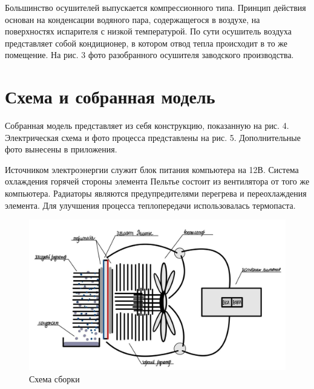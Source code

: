 \documentclass[a4paper,12pt]{article} %
\begin{document}
Большинство осушителей выпускается компрессионного типа. Принцип действия основан на конденсации водяного пара, содержащегося в воздухе, на поверхностях испарителя с низкой температурой. По сути осушитель воздуха представляет собой кондиционер, в котором отвод тепла происходит в то же помещение. На рис. 3 фото разобранного осушителя заводского производства.


\newpage


\section{Схема и собранная модель}

Собранная модель представляет из себя конструкцию, показанную на рис. 4. Электрическая схема и фото процесса представлены на рис. 5. Дополнительные фото вынесены в приложения.

Источником электроэнергии служит блок питания компьютера на 12В. Система охлаждения горячей стороны элемента Пельтье состоит из вентилятора от того же компьютера. Радиаторы являются предупредителями перегрева и переохлаждения элемента. Для улучшения процесса теплопередачи использовалась термопаста.

\begin{figure}[h!]
	\centering
	\includegraphics[scale=0.4]{pic.jpg}
	\caption{Схема сборки}
\end{figure}
\end{document}
